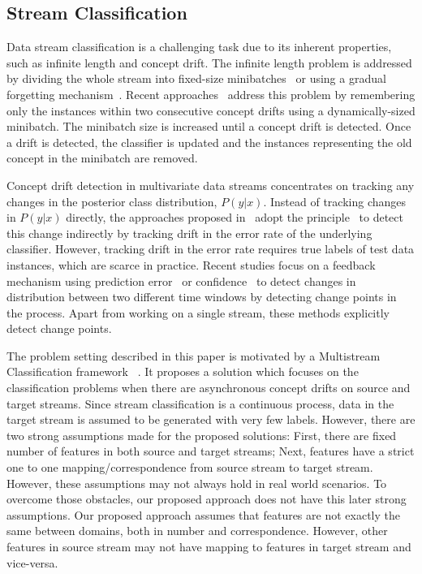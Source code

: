 \subsection{Stream Classification}
Data stream classification is a challenging task due to its inherent properties, such as infinite length and concept drift. The infinite length problem is addressed by dividing the whole stream into fixed-size minibatches~\cite{conf/icdm/MasudGKHT08} or using a gradual forgetting mechanism~\cite{journals/ida/Klinkenberg04}. Recent approaches~\cite{conf/icde/HaqueKBTA16,conf/sdm/BifetG07} address this problem by remembering only the instances within two consecutive concept drifts using a dynamically-sized minibatch. The minibatch size is increased until a concept drift is detected. Once a drift is detected, the classifier is updated and the instances representing the old concept in the minibatch are removed.

Concept drift detection in multivariate data streams concentrates on tracking any changes in the posterior class distribution, $P(y|x)$. Instead of tracking changes in $P(y|x)$ directly, the approaches proposed in~\cite{conf/sbia/GamaMCR04} adopt the principle~\cite{books/daglib/0097035} to detect this change indirectly by tracking drift in the error rate of the underlying classifier. However, tracking drift in the error rate requires true labels of test data instances, which are scarce in practice. Recent studies focus on a feedback mechanism using prediction error~\cite{conf/sbia/GamaMCR04} or confidence~\cite{conf/cikm/ChandraHKA16} to detect changes in distribution between two different time windows by detecting change points in the process. Apart from working on a single stream, these methods explicitly detect change points.

The problem setting described in this paper is motivated by a Multistream Classification framework ~\cite{conf/cikm/ChandraHKA16}. It proposes a solution which focuses on the classification problems when there are asynchronous concept drifts on source and target streams. Since stream classification is a continuous process, data in the target stream is assumed to be generated with very few labels. However, there are two strong assumptions made for the proposed solutions: First, there are fixed number of features in both source and target streams; Next, features have a strict one to one mapping/correspondence from source stream to target stream. However, these assumptions may not  always hold in real world scenarios. To overcome those obstacles, our proposed approach does not have this later strong assumptions. Our proposed approach assumes that features are not exactly the same between domains, both in number and correspondence. However, other features in source stream may not have mapping to features in target stream and vice-versa. 

